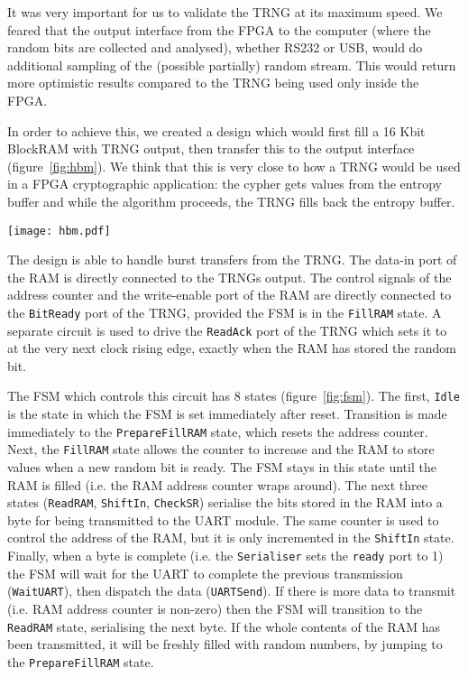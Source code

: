 \documentclass[conference]{IEEEtran}
\begin{document}
It was very important for us to validate the TRNG at its maximum speed. We feared that the output interface from the FPGA to the computer (where the random bits are collected and analysed), whether RS232 or USB, would do additional sampling of the (possible partially) random stream. This would return more optimistic results compared to the TRNG being used only inside the FPGA.

In order to achieve this, we created a design which would first fill a 16 Kbit BlockRAM with TRNG output, then transfer this to the output interface (figure~\ref{fig:hbm}). We think that this is very close to how a TRNG would be used in a FPGA cryptographic application: the cypher gets values from the entropy buffer and while the algorithm proceeds, the TRNG fills back the entropy buffer. 

\begin{figure*}
\centering
\texttt{[image: hbm.pdf]}
\caption{High-throughput Measurement Scheme}
\label{fig:hbm}
\end{figure*}

The design is able to handle burst transfers from the TRNG. The data-in port of the RAM is directly connected to the TRNGs output. The control signals of the address counter and the write-enable port of the RAM are directly connected to the {\tt BitReady} port of the TRNG, provided the FSM is in the {\tt FillRAM} state. A separate circuit is used to drive the {\tt ReadAck} port of the TRNG which sets it to  at the very next clock rising edge, exactly when the RAM has stored the random bit.

The FSM which controls this circuit has 8 states (figure~\ref{fig:fsm}). The first, {\tt Idle} is the state in which the FSM is set immediately after reset. Transition is made immediately to the {\tt PrepareFillRAM} state, which resets the address counter. Next, the {\tt FillRAM} state allows the counter to increase and the RAM to store values when a new random bit is ready. The FSM stays in this state until the RAM is filled (i.e. the RAM address counter wraps around). The next three states ({\tt ReadRAM}, {\tt ShiftIn}, {\tt CheckSR}) serialise the bits stored in the RAM into a byte for being transmitted to the UART module. The same counter is used to control the address of the RAM, but it is only incremented in the {\tt ShiftIn} state. Finally, when a byte is complete (i.e. the {\tt Serialiser} sets the {\tt ready} port to 1) the FSM will wait for the UART to complete the previous transmission ({\tt WaitUART}), then dispatch the data ({\tt UARTSend}). If there is more data to transmit (i.e. RAM address counter is non-zero) then the FSM will transition to the {\tt ReadRAM} state, serialising the next byte. If the whole contents of the RAM has been transmitted, it will be freshly filled with random numbers, by jumping to the {\tt PrepareFillRAM} state.
\end{document}
